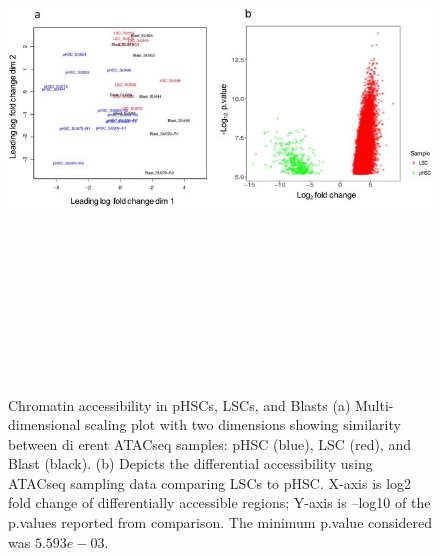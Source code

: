 \begin{figure}
    \centering
    \includegraphics[height = 15cm, width = 15cm]{tex/tes/41598_2017_7356_Fig6_HTML.jpg}
    \caption{Chromatin accessibility in pHSCs, LSCs, and Blasts (a) Multi-dimensional scaling plot with two dimensions showing similarity between di erent ATACseq samples: pHSC (blue), LSC (red), and Blast (black). (b) Depicts the differential accessibility using ATACseq sampling data comparing LSCs to pHSC. X-axis is log2 fold change of differentially accessible regions; Y-axis is –log10 of the p.values reported from comparison.  The minimum p.value considered was $5.593e-03$.}
    \label{fig:tes6}
\end{figure}

